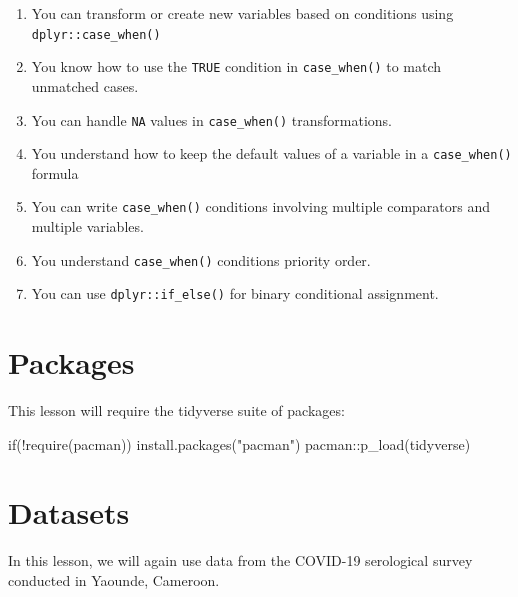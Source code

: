 \documentclass[
  letterpaper,
  DIV=11,
  numbers=noendperiod]{scrreprt}
\newenvironment{Shaded}{\begin{snugshade}}{\end{snugshade}}
\newcommand{\ControlFlowTok}[1]{\textcolor[rgb]{0.00,0.23,0.31}{#1}}
\newcommand{\FunctionTok}[1]{\textcolor[rgb]{0.28,0.35,0.67}{#1}}
\newcommand{\NormalTok}[1]{\textcolor[rgb]{0.00,0.23,0.31}{#1}}
\newcommand{\SpecialCharTok}[1]{\textcolor[rgb]{0.37,0.37,0.37}{#1}}
\newcommand{\StringTok}[1]{\textcolor[rgb]{0.13,0.47,0.30}{#1}}
\begin{document}
\begin{enumerate}
\def\labelenumi{\arabic{enumi}.}
\item
  You can transform or create new variables based on conditions using
  \texttt{dplyr::case\_when()}
\item
  You know how to use the \texttt{TRUE} condition in
  \texttt{case\_when()} to match unmatched cases.
\item
  You can handle \texttt{NA} values in \texttt{case\_when()}
  transformations.
\item
  You understand how to keep the default values of a variable in a
  \texttt{case\_when()} formula
\item
  You can write \texttt{case\_when()} conditions involving multiple
  comparators and multiple variables.
\item
  You understand \texttt{case\_when()} conditions priority order.
\item
  You can use \texttt{dplyr::if\_else()} for binary conditional
  assignment.
\end{enumerate}

\hypertarget{packages-5}{%
\section{Packages}\label{packages-5}}

This lesson will require the tidyverse suite of packages:

\begin{Shaded}
\begin{Highlighting}[]
\ControlFlowTok{if}\NormalTok{(}\SpecialCharTok{!}\FunctionTok{require}\NormalTok{(pacman)) }\FunctionTok{install.packages}\NormalTok{(}\StringTok{"pacman"}\NormalTok{)}
\NormalTok{pacman}\SpecialCharTok{::}\FunctionTok{p\_load}\NormalTok{(tidyverse)}
\end{Highlighting}
\end{Shaded}

\hypertarget{datasets-1}{%
\section{Datasets}\label{datasets-1}}

In this lesson, we will again use data from the COVID-19 serological
survey conducted in Yaounde, Cameroon.
\end{document}
